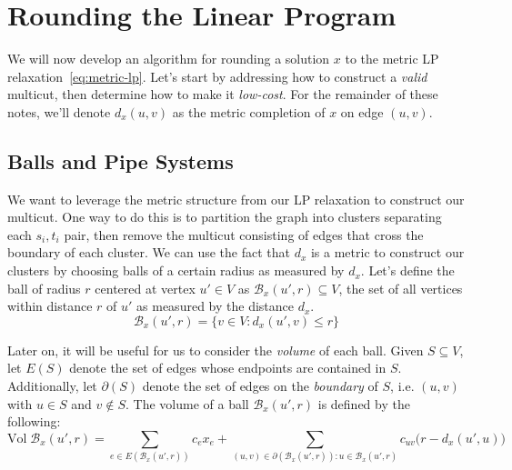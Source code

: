 \section{Rounding the Linear Program}

We will now develop an algorithm for rounding a solution $x$ to the metric LP relaxation~\ref{eq:metric-lp}. Let's start by addressing how to construct a \emph{valid} multicut, then determine how to make it \emph{low-cost}. For the remainder of these notes, we'll denote $d_x(u, v)$ as the metric completion of $x$ on edge $(u, v)$.


\subsection{Balls and Pipe Systems}

We want to leverage the metric structure from our LP relaxation to construct our multicut. One way to do this is to partition the graph into clusters separating each $s_i, t_i$ pair, then remove the multicut consisting of edges that cross the boundary of each cluster. We can use the fact that $d_x$ is a metric to construct our clusters by choosing balls of a certain radius as measured by $d_x$. Let's define the ball of radius $r$ centered at vertex $u' \in V$ as $\mathcal{B}_x(u', r) \subseteq V$, the set of all vertices within distance $r$ of $u'$ as measured by the distance $d_x$.
\begin{equation*}
\mathcal{B}_x(u', r) = \{ v \in V : d_x(u', v) \leq r \}
\end{equation*}

Later on, it will be useful for us to consider the \emph{volume} of each ball. Given $S \subseteq V$, let $E(S)$ denote the set of edges whose endpoints are contained in $S$. Additionally, let $\partial(S)$ denote the set of edges on the \emph{boundary} of $S$, i.e. $(u, v)$ with $u \in S$ and $v \notin S$. The volume of a ball $\mathcal{B}_x(u', r)$ is defined by the following:
\begin{equation*}
\text{Vol} \; \mathcal{B}_x(u', r)
= \sum_{e \in E(\mathcal{B}_x(u', r))} c_e x_e + \sum_{(u, v) \in \partial(\mathcal{B}_x(u', r)) : u \in \mathcal{B}_x(u', r)} c_{uv} \big( r - d_x(u', u) \big)
\end{equation*}

